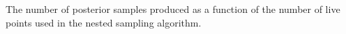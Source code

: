 \label{fig:numposts}
The number of posterior samples produced as a function of the number of live points used in the nested sampling algorithm.
